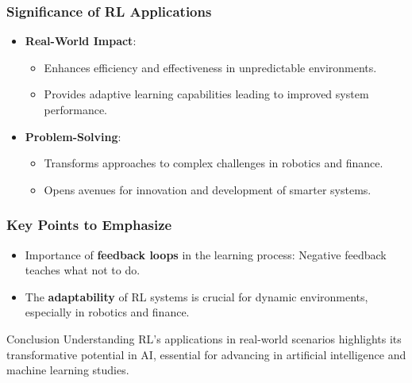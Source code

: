 \documentclass[aspectratio=169]{beamer}
\begin{document}
\begin{frame}[fragile]
    \frametitle{Significance of RL Applications}
    
    \begin{itemize}
        \item \textbf{Real-World Impact}:
            \begin{itemize}
                \item Enhances efficiency and effectiveness in unpredictable environments.
                \item Provides adaptive learning capabilities leading to improved system performance.
            \end{itemize}
        \item \textbf{Problem-Solving}:
            \begin{itemize}
                \item Transforms approaches to complex challenges in robotics and finance.
                \item Opens avenues for innovation and development of smarter systems.
            \end{itemize}
    \end{itemize}
\end{frame}

\begin{frame}[fragile]
    \frametitle{Key Points to Emphasize}
    
    \begin{itemize}
        \item Importance of \textbf{feedback loops} in the learning process: Negative feedback teaches what not to do.
        \item The \textbf{adaptability} of RL systems is crucial for dynamic environments, especially in robotics and finance.
    \end{itemize}
    
    \begin{block}{Conclusion}
        Understanding RL's applications in real-world scenarios highlights its transformative potential in AI, essential for advancing in artificial intelligence and machine learning studies.
    \end{block}
\end{frame}
\end{document}
